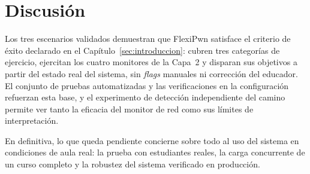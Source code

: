 \section{Discusión}
\label{sec:discusion}

Los tres escenarios validados demuestran que FlexiPwn satisface el criterio de
éxito declarado en el Capítulo~\ref{sec:introduccion}: cubren tres categorías de
ejercicio, ejercitan los cuatro monitores de la Capa~2 y disparan sus objetivos
a partir del estado real del sistema, sin \textit{flags} manuales ni corrección
del educador. El conjunto de pruebas automatizadas y las verificaciones en la
configuración refuerzan esta base, y el experimento de detección independiente
del camino permite ver tanto la eficacia del monitor de red como sus límites de
interpretación.

En definitiva, lo que queda pendiente concierne sobre todo al uso del sistema en
condiciones de aula real: la prueba con estudiantes reales, la carga concurrente
de un curso completo y la robustez del sistema verificado en producción.